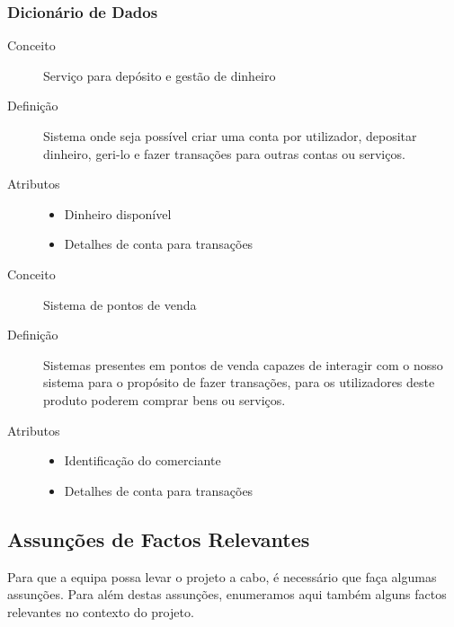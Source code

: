 \documentclass{article}
\begin{document}
    \subsubsection{Dicionário de Dados}

      \begin{description}
        \item[Conceito]Serviço para depósito e gestão de dinheiro
        \item[Definição]Sistema onde seja possível criar uma conta por utilizador, depositar dinheiro, geri-lo e fazer transações para outras contas ou serviços.

        \item[Atributos] \hfill
          \begin{itemize}
            \item Dinheiro disponível
            \item Detalhes de conta para transações
          \end{itemize}
      \end{description}
      
      \vspace{0.5cm}
      
      \begin{description}
        \item[Conceito]Sistema de pontos de venda
        \item[Definição]Sistemas presentes em pontos de venda capazes de interagir com o nosso sistema para o propósito de fazer transações, para os utilizadores deste produto poderem comprar bens ou serviços.

        \item[Atributos]\hfill
          \begin{itemize}
            \item Identificação do comerciante
            \item Detalhes de conta para transações
          \end{itemize}
      \end{description}

  \subsection{Assunções de Factos Relevantes}
    Para que a equipa possa levar o projeto a cabo, é necessário que faça algumas assunções. Para além destas assunções, enumeramos aqui também alguns factos relevantes no contexto do projeto.
\end{document}
